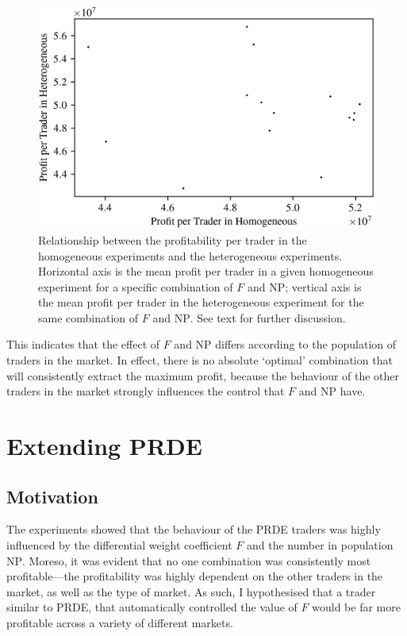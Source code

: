 \documentclass[conference]{IEEEtran}
\begin{document}
\begin{figure}[htbp]
    \centerline{\includegraphics[width=\columnwidth]{heterogeneous_homogeneous_scatter.png}}
    \caption{
        Relationship between the profitability per trader in the homogeneous experiments and the heterogeneous experiments.
        Horizontal axis is the mean profit per trader in a given homogeneous experiment for a specific combination of $F$ and $\mathrm{NP}$; vertical axis is the mean profit per trader in the heterogeneous experiment for the same combination of $F$ and $\mathrm{NP}$.
        See text for further discussion.
    }
    \label{heterogeneous_homogeneous}
\end{figure}

This indicates that the effect of $F$ and $\mathrm{NP}$ differs according to the population of traders in the market.
In effect, there is no absolute `optimal' combination that will consistently extract the maximum profit, because the behaviour of the other traders in the market strongly influences the control that $F$ and $\mathrm{NP}$ have.

\section{Extending PRDE}

\subsection{Motivation}

The experiments showed that the behaviour of the PRDE traders was highly influenced by the differential weight coefficient $F$ and the number in population $\mathrm{NP}$.
Moreso, it was evident that no one combination was consistently most profitable---the profitability was highly dependent on the other traders in the market, as well as the type of market.
As such, I hypothesised that a trader similar to PRDE, that automatically controlled the value of $F$ would be far more profitable across a variety of different markets.
\end{document}
